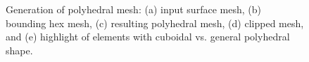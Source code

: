 \begin{figure}[ht]
{\label{fig:cel3}}		

\caption{Generation of polyhedral mesh: (a) input surface mesh, (b) bounding hex mesh,  (c) resulting polyhedral mesh, (d) clipped mesh, and (e) highlight of elements with cuboidal vs. general polyhedral shape.}
\label{fig:cel}
\end{figure}

